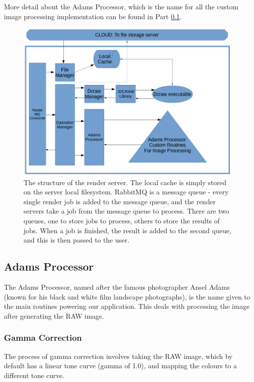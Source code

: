 \documentclass[10pt,a4paper]{article}
\begin{document}
More detail about the Adams Processor, which is the name for all the custom image processing implementation can be found in Part \ref{AdamsProcessor}.
\begin{figure}\label{renderserverdiagram}
    \includegraphics[width=\linewidth]{renderserverdiagram}
    \caption{The structure of the render server. The local cache is simply stored on the server local filesystem.
    RabbitMQ is a message queue - every single render job is added to the message queue, and the render servers take a job from the message queue
    to process. There are two queues, one to store jobs to process, others to store the results of jobs. When a job is finished, the result is added to the second
    queue, and this is then passed to the user.}
\end{figure}

\subsection{Adams Processor}\label{AdamsProcessor}
The Adams Processor, named after the famous photographer Ansel Adams (known for his black and white film landscape photographs), 
is the name given to the main routines powering our application. This deals with processing the image after generating the RAW image.
\subsubsection{Gamma Correction}
The process of gamma correction involves taking the RAW image, which by default has a linear tone curve (gamma of 1.0), and
mapping the colours to a different tone curve.
\end{document}
